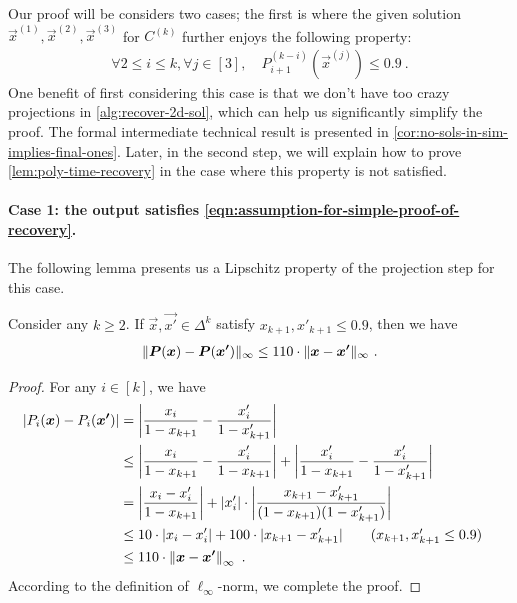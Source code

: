 Our proof will be considers two cases; the first is where
the given solution $\vec{x}^{(1)}, \vec{x}^{(2)}, \vec{x}^{(3)}$  for $C^{(k)}$ further enjoys the following property: 
\begin{align}
\label{eqn:assumption-for-simple-proof-of-recovery}
\forall 2\leq i\leq k, \forall j\in [3], \quad P_{i+1}^{(k-i)}(\vec{x}^{(j)})\leq 0.9~.
\end{align}
One benefit of first considering this case is that we don't have too crazy projections in \cref{alg:recover-2d-sol}, which can help us significantly simplify the proof.
The formal intermediate technical result is presented in \cref{cor:no-sols-in-sim-implies-final-ones}.
Later, in the second step, we will explain how to prove \cref{lem:poly-time-recovery} in the  case where this property is not satisfied.

\paragraph{Case 1: the output satisfies \cref{eqn:assumption-for-simple-proof-of-recovery}.}

The following lemma presents us a Lipschitz property of the projection step for this case. 

\begin{lemma}
\label{lem:lipschitz-of-projection}
Consider any $k\geq 2$. 
If $\vec{x}, \vec{x'}\in \Delta^k$ satisfy $x_{k+1},x'_{k+1}\leq 0.9$, then we have 
\begin{align*}
    \| {\boldsymbol{P}(\boldsymbol{x})-\boldsymbol{P}(\boldsymbol{x'})} \|_{\infty} \leq 110\cdot \| {\boldsymbol{x}-\boldsymbol{x'}} \|_{\infty}~.
\end{align*}
\end{lemma}
\begin{proof}
For any $i\in [k]$, we have
\begin{align*}
    \abs{P_i(\vec{x}) - P_i(\vec{x'})} 
    &= 
    \abs{\frac{x_i}{1-x_{k+1}} - \frac{x'_i}{1-x'_{k+1}}}
    \\
    &\leq
    \abs{\frac{x_i}{1-x_{k+1}} - \frac{x'_i}{1-x_{k+1}}} + \abs{\frac{x'_i}{1-x_{k+1}} - \frac{x'_i}{1-x'_{k+1}}}
    \\
    &=
    \abs{\frac{x_i-x'_i}{1-x_{k+1}}} + |x'_i|\cdot \abs{\frac{x_{k+1}-x'_{k+1}}{(1-x_{k+1})(1-x'_{k+1})}}
    \\
    &\leq
    10 \cdot |x_i-x'_i| + 100\cdot |x_{k+1}-x'_{k+1}|
    \tag{$x_{k+1},x'_{k+1}\leq 0.9$}
    \\
    &\leq
    110\cdot \norm{\vec{x}-\vec{x'}}{\infty}~. &
\end{align*}
According to the definition of $\ell_\infty$-norm, we complete the proof.
\end{proof}

